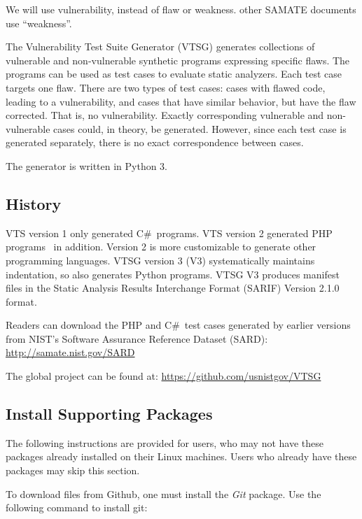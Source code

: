 \documentclass[12pt]{article}
\newcommand{\CSharp}{C{\fontseries{b}\selectfont\#}}
\begin{document}
{\Large We will use vulnerability, instead of flaw or weakness. other SAMATE documents use ``weakness''.}

The Vulnerability Test Suite Generator (VTSG) generates collections 
of vulnerable and non-vulnerable
synthetic programs expressing specific flaws.  
The programs can be used as 
test cases to evaluate static analyzers. 
Each test case targets one flaw. There are two types of test cases:
cases with flawed code, leading to a vulnerability, and cases that
have similar behavior, but have the flaw corrected. That is, no
vulnerability.  Exactly corresponding vulnerable and non-vulnerable
cases could, in theory, be generated. However, since each test case
is generated separately, there is no exact correspondence between 
cases.

The generator is written in Python 3.

\subsection{History} 

VTS version 1 only generated \CSharp\ programs. VTS version 2 generated PHP
programs~\cite{StivaletFongVTSPHP2016} in addition.  Version 2 is more
customizable to generate other programming languages.
VTSG version 3 (V3) systematically maintains indentation, so also
generates Python programs.  VTSG V3 produces manifest files in the
Static Analysis Results Interchange Format (SARIF) 
Version 2.1.0~\cite{SARIF2.1.0} format.

Readers can download the PHP and \CSharp\ test cases generated 
by earlier versions from NIST’s Software Assurance Reference 
Dataset (SARD):
\href{http://samate.nist.gov/SARD}{http://samate.nist.gov/SARD}

The global project can be found at: \href{https://github.com/usnistgov/VTSG}{https://github.com/usnistgov/VTSG}\\


\subsection{Install Supporting Packages}

\noindent The following instructions are provided for users, who may not have these packages already installed on their Linux machines. Users who already have these packages may skip this section.

\noindent To download files from Github, one must install the \emph{Git} package. Use the following command to install git:
\end{document}

